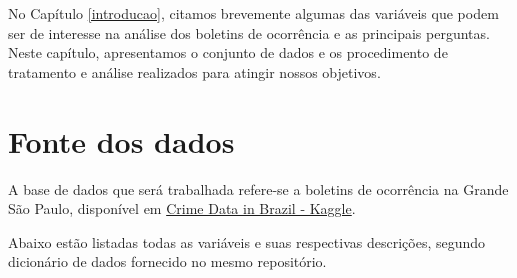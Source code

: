 \documentclass[
  12pt,
]{report}
\begin{document}
No Capítulo \ref{introducao}, citamos brevemente algumas das variáveis que podem ser de interesse na análise dos boletins de ocorrência e as principais perguntas. Neste capítulo, apresentamos o conjunto de dados e os procedimento de tratamento e análise realizados para atingir nossos objetivos.

\hypertarget{fonte-dos-dados}{%
\section{Fonte dos dados}\label{fonte-dos-dados}}

A base de dados que será trabalhada refere-se a boletins de ocorrência na Grande São Paulo, disponível em \href{https://www.kaggle.com/inquisitivecrow/crime-data-in-brazil}{Crime Data in Brazil - Kaggle}.

Abaixo estão listadas todas as variáveis e suas respectivas descrições, segundo dicionário de dados fornecido no mesmo repositório.
\end{document}
